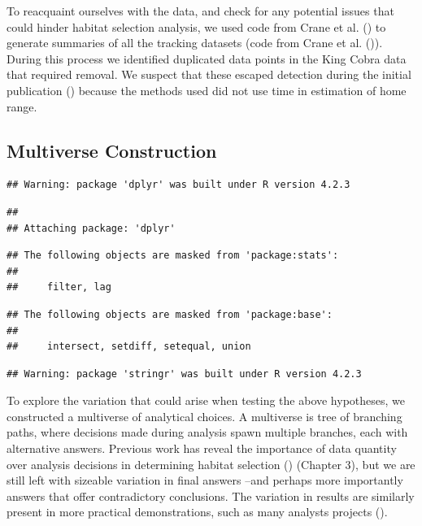 \documentclass[10pt,a4paper]{article}
\begin{document}
To reacquaint ourselves with the data, and check for any potential issues that could hinder habitat selection analysis, we used code from Crane et al. () to generate summaries of all the tracking datasets (code from Crane et al. ()).
During this process we identified duplicated data points in the King Cobra data that required removal.
We suspect that these escaped detection during the initial publication () because the methods used did not use time in estimation of home range.

\subsection{Multiverse Construction}\label{multiverse-construction}

\begin{verbatim}
## Warning: package 'dplyr' was built under R version 4.2.3
\end{verbatim}

\begin{verbatim}
## 
## Attaching package: 'dplyr'
\end{verbatim}

\begin{verbatim}
## The following objects are masked from 'package:stats':
## 
##     filter, lag
\end{verbatim}

\begin{verbatim}
## The following objects are masked from 'package:base':
## 
##     intersect, setdiff, setequal, union
\end{verbatim}

\begin{verbatim}
## Warning: package 'stringr' was built under R version 4.2.3
\end{verbatim}

To explore the variation that could arise when testing the above hypotheses, we constructed a multiverse of analytical choices.
A multiverse is tree of branching paths, where decisions made during analysis spawn multiple branches, each with alternative answers.
Previous work has reveal the importance of data quantity over analysis decisions in determining habitat selection () (Chapter 3), but we are still left with sizeable variation in final answers --and perhaps more importantly answers that offer contradictory conclusions.
The variation in results are similarly present in more practical demonstrations, such as many analysts projects ().
\end{document}
